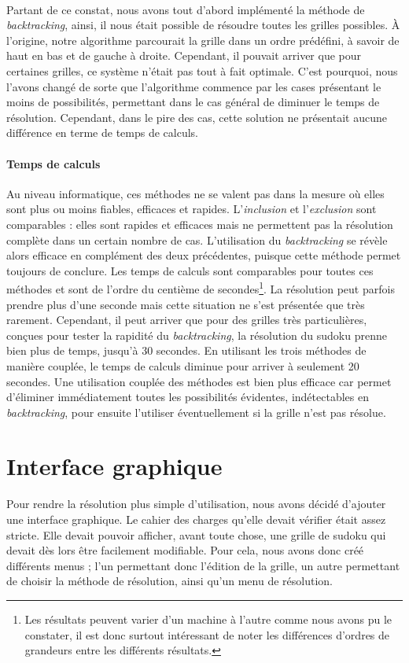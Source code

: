 \documentclass[12pt,a4paper]{report}
\begin{document}
\paragraph{} Partant de ce constat, nous avons tout d'abord implémenté la méthode de \emph{backtracking}, ainsi, il nous était possible de résoudre toutes les grilles possibles. \`{A} l'origine, notre algorithme parcourait la grille dans un ordre prédéfini, à savoir de haut en bas et de gauche à droite. Cependant, il pouvait arriver que pour certaines grilles, ce système n'était pas tout à fait optimale. C'est pourquoi, nous l'avons changé de sorte que l'algorithme commence par les cases présentant le moins de possibilités, permettant dans le cas général de diminuer le temps de résolution. Cependant, dans le pire des cas, cette solution ne présentait aucune différence en terme de temps de calculs. 

\paragraph{Temps de calculs} Au niveau informatique, ces méthodes ne se valent pas dans la mesure où elles sont plus ou moins fiables, efficaces et rapides. L'\emph{inclusion} et l'\emph{exclusion} sont comparables : elles sont rapides et efficaces mais ne permettent pas la résolution complète dans un certain nombre de cas. L'utilisation du \emph{backtracking} se révèle alors efficace en complément des deux précédentes, puisque cette méthode permet toujours de conclure. Les temps de calculs sont comparables pour toutes ces méthodes et sont de l'ordre du centième de secondes\footnote{Les résultats peuvent varier d'un machine à l'autre comme nous avons pu le constater, il est donc surtout intéressant de noter les différences d'ordres de grandeurs entre les différents résultats.}. La résolution peut parfois prendre plus d'une seconde mais cette situation ne s'est présentée que très rarement. Cependant, il peut arriver que pour des grilles très particulières, conçues pour tester la rapidité du \emph{backtracking}, la résolution du sudoku prenne bien plus de temps, jusqu'à 30 secondes. En utilisant les trois méthodes de manière couplée, le temps de calculs diminue pour arriver à seulement 20 secondes. Une utilisation couplée des méthodes est bien plus efficace car permet d'éliminer immédiatement toutes les possibilités évidentes, indétectables en \emph{backtracking}, pour ensuite l'utiliser éventuellement si la grille n'est pas résolue.


\section{Interface graphique}
Pour rendre la résolution plus simple d'utilisation, nous avons décidé d'ajouter une interface graphique. Le cahier des charges qu'elle devait vérifier était assez stricte. Elle devait pouvoir afficher, avant toute chose, une grille de sudoku qui devait dès lors être facilement modifiable. Pour cela, nous avons donc créé différents menus ; l'un permettant donc l'édition de la grille, un autre permettant de choisir la méthode de résolution, ainsi qu'un menu de résolution. 
\end{document}
